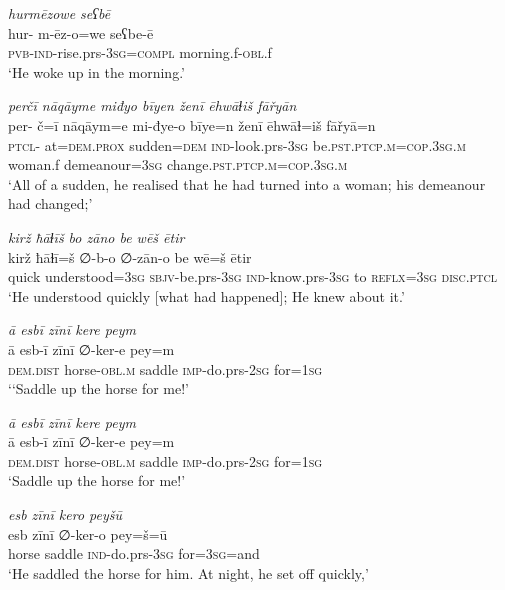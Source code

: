\ea \label{ŠJ.47}
\textit{hurmēzowe seʕbē} \\ 
\gll hur- m-ēz-o=we seʕbe-ē \\ 
 \textsc{pvb-}\textsc{ind-}rise.prs\textsc{-3sg}\textsc{=compl} morning.f\textsc{-obl}.f \\ 
\glt `He woke up in the morning.'
\z 
 
\ea \label{ŠJ.48}
\textit{perčī nāqāyme miđyo bīyen ženī ēhwāɫiš fāřyān} \\ 
\gll per- č=ī nāqāym=e mi-đye-o bīye=n ženī ēhwāɫ=iš fāřyā=n \\ 
 \textsc{ptcl}- at=\textsc{dem.prox} sudden\textsc{=dem} \textsc{ind-}look.prs\textsc{-3sg} be\textsc{.pst}\textsc{.ptcp}\textsc{.m}\textsc{=cop}\textsc{.3sg}\textsc{.m} woman.f demeanour\textsc{=3sg} change\textsc{.pst}\textsc{.ptcp}\textsc{.m}\textsc{=cop}\textsc{.3sg}\textsc{.m} \\ 
\glt `All of a sudden, he realised that he had turned into a woman; his demeanour had changed;'
\z 
 
\ea \label{ŠJ.50}
\textit{kirž ħāɫīš bo zāno be wēš ētir} \\ 
\gll kirž ħāɫī=š ∅-b-o ∅-zān-o be wē=š ētir \\ 
 quick understood\textsc{=3sg} \textsc{sbjv-}be.prs\textsc{-3sg} \textsc{ind-}know.prs\textsc{-3sg} to \textsc{reflx}\textsc{=3sg} \textsc{disc.ptcl} \\ 
\glt `He understood quickly [what had happened]; He knew about it.'
\z 
 
\ea \label{ŠJ.52}
\textit{ā esbī zīnī kere peym} \\ 
\gll ā esb-ī zīnī ∅-ker-e pey=m \\ 
 \textsc{dem.dist} horse\textsc{-obl}\textsc{.m} saddle \textsc{imp-}do.prs-\textsc{2sg} for\textsc{=\textsc{1sg}} \\ 
\glt `‘Saddle up the horse for me!'
\z 
 
\ea \label{ŠJ.53}
\textit{ā esbī zīnī kere peym} \\ 
\gll ā esb-ī zīnī ∅-ker-e pey=m \\ 
 \textsc{dem.dist} horse\textsc{-obl}\textsc{.m} saddle \textsc{imp-}do.prs-\textsc{2sg} for\textsc{=\textsc{1sg}} \\ 
\glt `Saddle up the horse for me!'
\z 
 
\ea \label{ŠJ.54}
\textit{esb zīnī kero peyšū} \\ 
\gll esb zīnī ∅-ker-o pey=š=ū \\ 
 horse saddle \textsc{ind-}do.prs\textsc{-3sg} for\textsc{=3sg}=and \\ 
\glt `He saddled the horse for him. At night, he set off quickly,'
\z 
 
